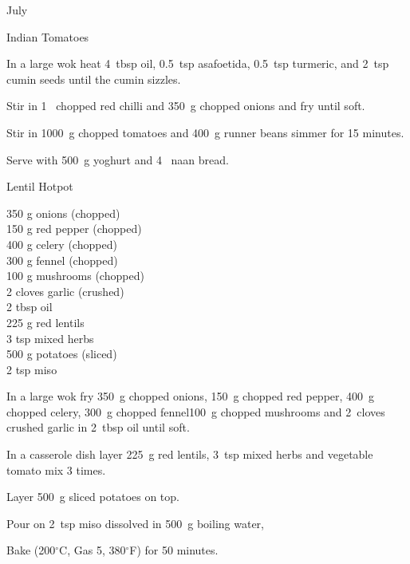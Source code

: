\begin{menu}{July}
\begin{recipe}{2}{Indian Tomatoes}
\begin{ingredients}
		\end{ingredients}
	
	
    \begin{instructions}
    \item 
        In a large wok heat
        4~tbsp  oil,
        0.5~tsp  asafoetida,
        0.5~tsp  turmeric,
        and
        2~tsp  cumin seeds
        until
        the cumin sizzles.
      \item 
        Stir in
        1~ chopped red chilli
        and
        350~g chopped onions
        and
        fry until soft.
      \item 
        Stir in
        1000~g chopped tomatoes
        and
        400~g  runner beans
        simmer for 15 minutes.
      \item 
        Serve with
        500~g  yoghurt
        and
        4~  naan bread.
      
    \end{instructions}
    \end{recipe}%
  
    \begin{recipe}{2}{Lentil Hotpot}%
		\begin{ingredients}
		350 g onions (chopped) \\
	150 g red pepper (chopped) \\
	400 g celery (chopped) \\
	300 g fennel (chopped) \\
	100 g mushrooms (chopped) \\
	2 cloves garlic (crushed) \\
	2 tbsp oil  \\
	225 g red lentils  \\
	3 tsp mixed herbs  \\
	500 g potatoes (sliced) \\
	2 tsp miso  \\
	
		\end{ingredients}
	
	
    \begin{instructions}
    \item 
        In a large wok fry
        350~g chopped onions,
        150~g chopped red pepper,
        400~g chopped celery,
        300~g chopped fennel100~g chopped mushrooms
        and
        2~cloves crushed garlic
        in
        2~tbsp  oil
        until soft.
      \item 
        In a casserole dish layer
        225~g  red lentils,
        3~tsp  mixed herbs
        and vegetable tomato mix 3 times.
      \item 
        Layer 500~g sliced potatoes on top.
      \item 
        Pour on
        2~tsp  miso
        dissolved in
        500~g  boiling water,
      \item 
        Bake (200$^{\circ}$C, Gas 5, 380$^{\circ}$F) for 50 minutes.
      

\end{instructions}
\end{recipe}
\end{menu}
